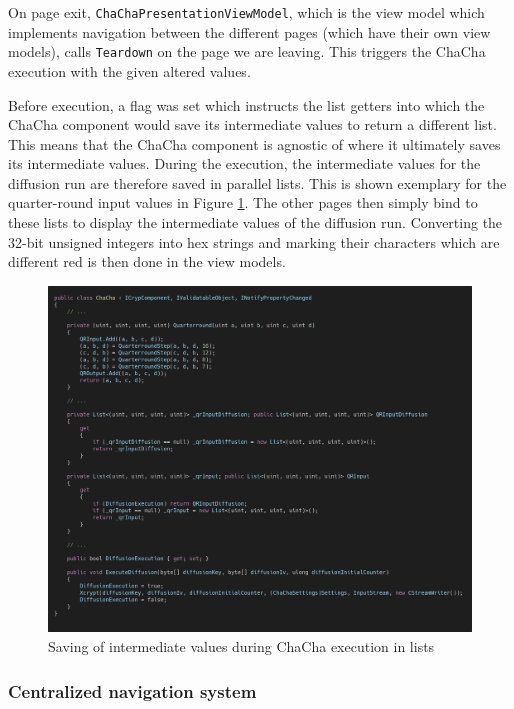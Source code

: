 On page exit, \texttt{ChaChaPresentationViewModel}, which is the view model which implements navigation between the different pages (which have their own view models), calls \texttt{Teardown} on the page we are leaving. This triggers the ChaCha execution with the given altered values.

Before execution, a flag was set which instructs the list getters into which the ChaCha component would save its intermediate values to return a different list. This means that the ChaCha component is agnostic of where it ultimately saves its intermediate values. During the execution, the intermediate values for the diffusion run are therefore saved in parallel lists. This is shown exemplary for the quarter-round input values in Figure \ref{fig:mvvm.chacha}. The other pages then simply bind to these lists to display the intermediate values of the diffusion run. Converting the 32-bit unsigned integers into hex strings and marking their characters which are different red is then done in the view models.

\begin{figure}
\centering
\includegraphics[width=\textwidth]{figures/code/mvvm-arch/chacha.png}
\caption[Intermediate values saving]{Saving of intermediate values during ChaCha execution in lists}
\label{fig:mvvm.chacha}
\end{figure}

\vfill

\FloatBarrier

\subsubsection{Centralized navigation system}

